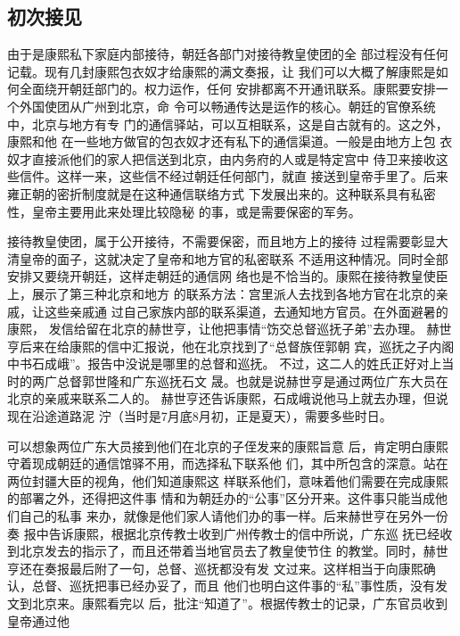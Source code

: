 \subsection{初次接见}
\par
由于是康熙私下家庭内部接待，朝廷各部门对接待教皇使团的全%
部过程没有任何记载。现有几封康熙包衣奴才给康熙的满文奏报，让%
我们可以大概了解康熙是如何全面绕开朝廷部门的。权力运作，任何%
安排都离不开通讯联系。康熙要安排一个外国使团从广州到北京，命%
令可以畅通传达是运作的核心。朝廷的官僚系统中，北京与地方有专%
门的通信驿站，可以互相联系，这是自古就有的。这之外，康熙和他%
在一些地方做官的包衣奴才还有私下的通信渠道。一般是由地方上包%
衣奴才直接派他们的家人把信送到北京，由内务府的人或是特定宫中%
侍卫来接收这些信件。这样一来，这些信不经过朝廷任何部门，就直%
接送到皇帝手里了。后来雍正朝的密折制度就是在这种通信联络方式%
下发展出来的。这种联系具有私密性，皇帝主要用此来处理比较隐秘%
的事，或是需要保密的军务。%
\par
接待教皇使团，属于公开接待，不需要保密，而且地方上的接待%
过程需要彰显大清皇帝的面子，这就决定了皇帝和地方官的私密联系%
不适用这种情况。同时全部安排又要绕开朝廷，这样走朝廷的通信网%
络也是不恰当的。康熙在接待教皇使臣上，展示了第三种北京和地方%
的联系方法：宫里派人去找到各地方官在北京的亲戚，让这些亲戚通%
过自己家族内部的联系渠道，去通知地方官员。在外面避暑的康熙，%
发信给留在北京的赫世亨，让他把事情“饬交总督巡抚子弟”去办理。%
赫世亨后来在给康熙的信中汇报说，他在北京找到了“总督族侄郭朝%
宾，巡抚之子内阁中书石成峨”。报告中没说是哪里的总督和巡抚。%
不过，这二人的姓氏正好对上当时的两广总督郭世隆和广东巡抚石文%
晟。也就是说赫世亨是通过两位广东大员在北京的亲戚来联系二人的。%
赫世亨还告诉康熙，石成峨说他马上就去办理，但说现在沿途道路泥%
泞（当时是7月底8月初，正是夏天），需要多些时日。%
\par
可以想象两位广东大员接到他们在北京的子侄发来的康熙旨意%
后，肯定明白康熙守着现成朝廷的通信馆驿不用，而选择私下联系他%
们，其中所包含的深意。站在两位封疆大臣的视角，他们知道康熙这%
样联系他们，意味着他们需要在完成康熙的部署之外，还得把这件事%
情和为朝廷办的“公事”区分开来。这件事只能当成他们自己的私事%
来办，就像是他们家人请他们办的事一样。后来赫世亨在另外一份奏%
报中告诉康熙，根据北京传教士收到广州传教士的信中所说，广东巡%
抚已经收到北京发去的指示了，而且还带着当地官员去了教皇使节住%
的教堂。同时，赫世亨还在奏报最后附了一句，总督、巡抚都没有发%
文过来。这样相当于向康熙确认，总督、巡抚把事已经办妥了，而且%
他们也明白这件事的“私”事性质，没有发文到北京来。康熙看完以%
后，批注“知道了”。根据传教士的记录，广东官员收到皇帝通过他%

